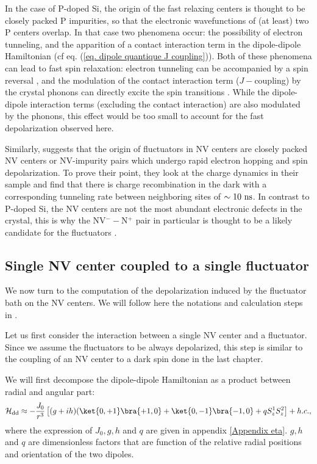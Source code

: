 \documentclass[a4paper, 11pt]{report}
\begin{document}
In the case of P-doped Si, the origin of the fast relaxing centers is thought to be closely packed P impurities, so that the electronic wavefunctions of (at least) two P centers overlap. In that case two phenomena occur: the possibility of electron tunneling, and the apparition of a contact interaction term in the dipole-dipole Hamiltonian (cf eq. (\ref{eq. dipole quantique J coupling})). Both of these phenomena can lead to fast spin relaxation: electron tunneling can be accompanied by a spin reversal \citep{sugihara1963spin}, and the modulation of the contact interaction term ($J-$coupling) by the crystal phonons can directly excite the spin transitions \citep{honig1960electron}. While the dipole-dipole interaction terms (excluding the contact interaction) are also modulated by the phonons, this effect would be too small to account for the fast depolarization observed here.

Similarly, \citep{choi2017depolarization} suggests that the origin of fluctuators in NV centers are closely packed NV centers or NV-impurity pairs which undergo rapid electron hopping and spin depolarization. To prove their point, they look at the charge dynamics in their sample and find that there is charge recombination in the dark with a corresponding tunneling rate between neighboring sites of $\sim 10\ \rm ns$. In contrast to P-doped Si, the NV centers are not the most abundant electronic defects in the crystal, this is why the NV$^--$N$^+$ pair in particular is thought to be a likely candidate for the fluctuators \citep{manson2018nv}.

\subsection{Single NV center coupled to a single fluctuator}
We now turn to the computation of the depolarization induced by the fluctuator bath on the NV centers. We will follow here the notations and calculation steps in \citep{choi2017depolarization}. 

Let us first consider the interaction between a single NV center and a fluctuator. Since we assume the fluctuators to be always depolarized, this step is similar to the coupling of an NV center to a dark spin done in the last chapter.

We will first decompose the dipole-dipole Hamiltonian as a product between radial and angular part:
\begin{equation}
\mathcal{H}_{\rm dd} \approx - \frac{J_0}{r^3} \left[(g+ih)(\ket{0,+1}\bra{+1,0}+\ket{0,-1}\bra{-1,0}+qS_z^1 S_z^2 \right] + h.c. ,
\end{equation}
where the expression of $J_0, g, h$ and $q$ are given in appendix \ref{Appendix eta}. $g, h$ and $q$ are dimensionless factors that are function of the relative radial positions and orientation of the two dipoles.
\end{document}

